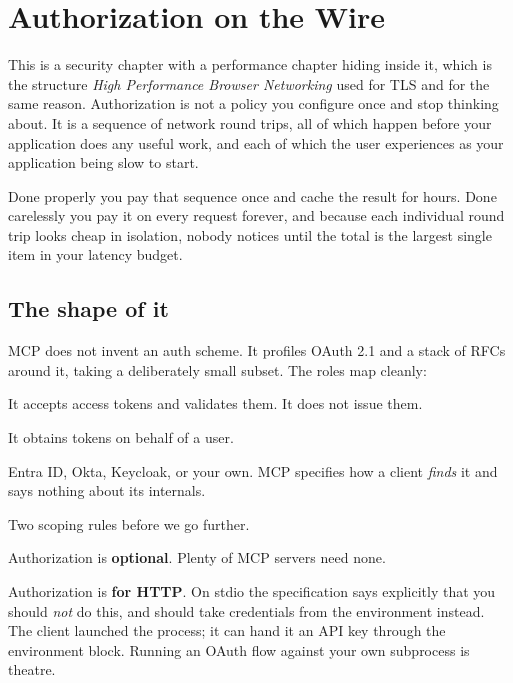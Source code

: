 \chapter{Authorization on the Wire}
\label{ch:authorization}

This is a security chapter with a performance chapter hiding inside it, which is
the structure \emph{High Performance Browser Networking} used for TLS and for
the same reason. Authorization is not a policy you configure once and stop
thinking about. It is a sequence of network round trips, all of which happen
before your application does any useful work, and each of which the user
experiences as your application being slow to start.

Done properly you pay that sequence once and cache the result for hours. Done
carelessly you pay it on every request forever, and because each individual
round trip looks cheap in isolation, nobody notices until the total is the
largest single item in your latency budget.

\section{The shape of it}

MCP does not invent an auth scheme. It profiles OAuth 2.1 and a stack of RFCs
around it, taking a deliberately small subset. The roles map cleanly:

\begin{description}[leftmargin=1.4em, style=nextline, itemsep=3pt]
\item[The MCP server is an OAuth resource server.] It accepts access tokens and
validates them. It does not issue them.
\item[The MCP client is an OAuth client.] It obtains tokens on behalf of a user.
\item[The authorization server is somebody else's problem.] Entra ID, Okta,
Keycloak, or your own. MCP specifies how a client \emph{finds} it and says nothing about its
internals.
\end{description}

Two scoping rules before we go further.

Authorization is \textbf{optional}. Plenty of MCP servers need none.

Authorization is \textbf{for HTTP}. On stdio the specification says explicitly
that you should \emph{not} do this, and should take credentials from the
environment instead. The client launched the process; it can hand it an API key
through the environment block. Running an OAuth flow against your own subprocess
is theatre.

